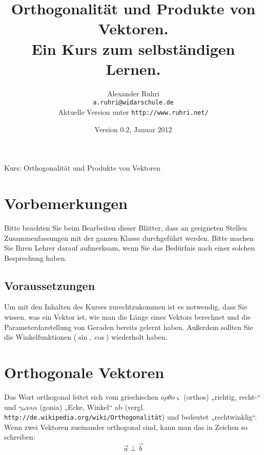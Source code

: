 \documentclass[12pt,a4paper,twoside,fleqn]{article}
\begin{document}
\renewcommand{\thepage}{Seite~\arabic{page}}
\renewcommand{\baselinestretch}{1.2}

\renewcommand{\labelenumi}{{\bf\arabic{enumi}.)}}
\renewcommand{\labelenumii}{{\bf\alph{enumii})}}
\renewcommand{\labelenumiii}{{\bf\roman{enumiii})}}

\renewcommand{\thecolumn}{{\bf\alph{column}\ }}
\newcommand{\labelcolumn}{{\bf\alph{column})\ \ \ }}
\setlength{\itemsep}{0pt}
\setlength{\mathindent}{0cm}


\pagestyle{myheadings}
%
{Kurs: Orthogonalität und Produkte von Vektoren\hfill}
\title{Orthogonalität und Produkte von Vektoren.\\\large{Ein Kurs
  zum selbständigen Lernen.}}
\author{Alexander Ruhri\\
  \small\texttt{a.ruhri@widarschule.de}\\
  \small Aktuelle Version unter \texttt{http://www.ruhri.net/}}
\date{\small Version 0.2, Januar 2012}
\maketitle
\section*{Vorbemerkungen}
Bitte beachten Sie beim Bearbeiten dieser Blätter, dass an geeigneten
Stellen Zusammenfassungen mit der ganzen Klasse durchgeführt
werden. Bitte machen Sie Ihren Lehrer darauf aufmerksam, wenn Sie das
Bedürfnis nach einer solchen Besprechung haben. 
\subsection*{Voraussetzungen}
Um mit den Inhalten des Kurses zurechtzukommen ist es notwendig,
dass Sie wissen, was ein Vektor ist, wie man die Länge eines Vektors
berechnet und die Parameterdarstellung von Geraden bereits gelernt
haben. Außerdem sollten Sie die Winkelfunktionen ($\sin, \cos$)
wiederholt haben. 
\tableofcontents
\newpage
\section{Orthogonale Vektoren}
Das Wort orthogonal leitet sich vom griechischen
$o\rho\theta o\varsigma$  (orthos)
„richtig, recht-“ und $\gamma\omega\nu\iota\alpha$ (gonia) „Ecke, Winkel“ ab
(vergl. \texttt{http://de.wikipedia.org/wiki/Orthogonalität}) und
bedeutet „rechtwinklig“. Wenn zwei Vektoren zueinander orthogonal
sind, kann man das in Zeichen so schreiben: $$\vec{a}\perp\vec{b}$$
\end{document}
